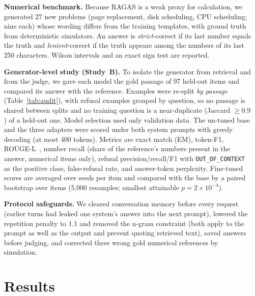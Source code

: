 \documentclass[conference]{IEEEtran}
\begin{document}
\textbf{Numerical benchmark.} Because RAGAS is a weak proxy for calculation, we generated 27 new problems (page replacement, disk scheduling, CPU scheduling; nine each) whose wording differs from the training templates, with ground truth from deterministic simulators. An answer is \emph{strict}-correct if its last number equals the truth and \emph{lenient}-correct if the truth appears among the numbers of its last 250 characters. Wilson intervals and an exact sign test are reported.

\textbf{Generator-level study (Study~B).} To isolate the generator from retrieval and from the judge, we gave each model the gold passage of 97 held-out items and compared its answer with the reference. Examples were re-split \emph{by passage} (Table~\ref{tab:audit}), with refusal examples grouped by question, so no passage is shared between splits and no training question is a near-duplicate (Jaccard $\ge0.9$) of a held-out one. Model selection used only validation data. The un-tuned base and the three adapters were scored under both system prompts with greedy decoding (at most 400 tokens). Metrics are exact match (EM), token-F1, ROUGE-L~\cite{lin2004rouge}, number recall (share of the reference's numbers present in the answer, numerical items only), refusal precision/recall/F1 with \texttt{OUT\_OF\_CONTEXT} as the positive class, false-refusal rate, and answer-token perplexity. Fine-tuned scores are averaged over seeds per item and compared with the base by a paired bootstrap over items (5{,}000 resamples; smallest attainable $p=2\times10^{-4}$).

\textbf{Protocol safeguards.} We cleared conversation memory before every request (earlier turns had leaked one system's answer into the next prompt), lowered the repetition penalty to 1.1 and removed the n-gram constraint (both apply to the prompt as well as the output and prevent quoting retrieved text), saved answers before judging, and corrected three wrong gold numerical references by simulation.

\section{Results}\label{sec:results}
\end{document}
